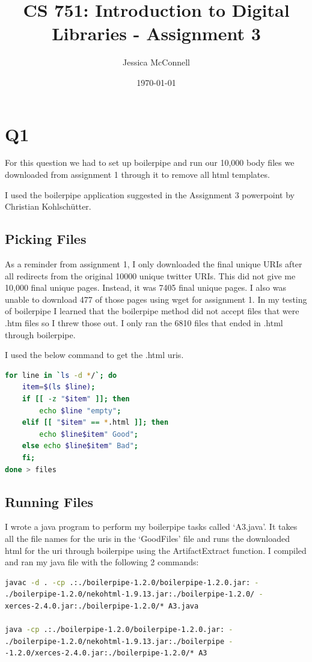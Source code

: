 \documentclass[12pt]{article}
\title{CS 751: Introduction to Digital Libraries - Assignment 3}
\author{Jessica McConnell}
\date{\today}
\begin{document}
\sloppy
\maketitle

\section{Q1}
For this question we had to set up boilerpipe and run our 10,000 body files we downloaded from assignment 1 through it to remove all html templates.

I used the boilerpipe application suggested in the Assignment 3 powerpoint by Christian Kohlschütter. \cite{Kohlschütter:2011:boilerpipe}

\subsection{Picking Files}
As a reminder from assignment 1, I only downloaded the final unique URIs after all redirects from the original 10000 unique twitter URIs. This did not give me 10,000 final unique pages. Instead, it was 7405 final unique pages. I also was unable to download 477 of those pages using wget for assignment 1. In my testing of boilerpipe I learned that the boilerpipe method did not accept files that were .htm files so I threw those out.  I only ran the 6810 files that ended in .html through boilerpipe.

I used the below command to get the .html uris.\\
\begin{lstlisting}[language=bash]
for line in `ls -d */`; do 
    item=$(ls $line); 
    if [[ -z "$item" ]]; then 
        echo $line "empty"; 
    elif [[ "$item" == *.html ]]; then 
        echo $line$item" Good"; 
    else echo $line$item" Bad"; 
    fi; 
done > files
\end{lstlisting}

\subsection{Running Files}
I wrote a java program to perform my boilerpipe tasks called `A3.java'.  It takes all the file names for the uris in the `GoodFiles' file and runs the downloaded html for the uri through boilerpipe using the ArtifactExtract function.  I compiled and ran my java file with the following 2 commands:

\begin{lstlisting}[language=bash]
javac -d . -cp .:./boilerpipe-1.2.0/boilerpipe-1.2.0.jar: - 
./boilerpipe-1.2.0/nekohtml-1.9.13.jar:./boilerpipe-1.2.0/ - 
xerces-2.4.0.jar:./boilerpipe-1.2.0/* A3.java

java -cp .:./boilerpipe-1.2.0/boilerpipe-1.2.0.jar: - 
./boilerpipe-1.2.0/nekohtml-1.9.13.jar:./boilerpipe - 
-1.2.0/xerces-2.4.0.jar:./boilerpipe-1.2.0/* A3
\end{lstlisting}
\end{document}

